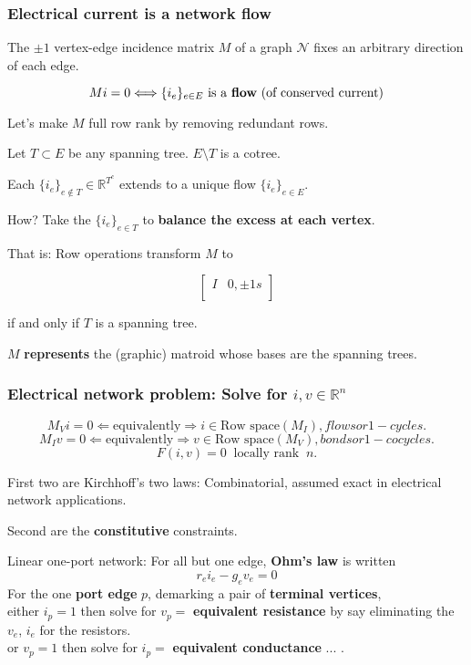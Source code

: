 \documentclass{beamer}
\newcommand{\Reals}{\ensuremath{\mathbb{R}}}
\begin{document}
\begin{frame}[fragile]
\frametitle{Electrical current is a network flow}

The $\pm 1$ vertex-edge incidence matrix $M$
of a graph $\mathcal{N}$ fixes 
an arbitrary direction of each edge.

\[
Mi=0 \Longleftrightarrow \{i_e\}_{e\in E} \text{ is a \textbf{flow} (of conserved
current)}
\]

Let's make $M$ full row rank by removing redundant rows.

Let $T\subset E$ be any spanning tree.  $E\setminus T$ is a cotree.

Each $\{i_e\}_{e\not\in T} \in \Reals^{T^c}$ extends to a unique flow 
$\{i_e\}_{e\in E}$. 

How?  Take the $\{i_e\}_{e\in T}$ to \textbf{balance
the excess at each vertex}.

That is: Row operations transform $M$ to 

\[
\left[
\begin{array}{c|c}
 I & 0,\pm 1 s \\
\end{array}
\right]
\]

\begin{center}
if and only if $T$ is a spanning tree.
\end{center}

$M$ \textbf{represents} the (graphic) 
matroid whose bases are the spanning trees.

\end{frame}


\begin{frame}
\frametitle{Electrical network problem: Solve for $i,v\in\Reals^n$}

\[
M_Vi = 0 \Leftarrow\text{equivalently}\Rightarrow i\in\text{Row space}{(M_I)},flows or 1-cycles.
\]
\[
M_Iv = 0 \Leftarrow\text{equivalently}\Rightarrow v\in\text{Row space}{(M_V)},bonds or 1-cocycles.
\]
\[
F(i,v) = 0 \;\;\text{locally rank}\;\;n.
\]

First two are Kirchhoff's two laws:  Combinatorial, assumed exact in electrical 
network applications.

Second are the \textbf{constitutive} constraints.

Linear one-port network:  For all but one edge, \textbf{Ohm's law} is written
\[r_ei_e - g_e v_e = 0\]
For the one \textbf{port edge} $p$, demarking a pair of 
\textbf{terminal vertices},\\
either
$i_p = 1$ then solve for $v_p=$ \textbf{equivalent resistance}
by say eliminating the $v_e$, $i_e$ for the resistors.\\
or $v_p = 1$ then solve for $i_p=$ \textbf{equivalent conductance} ... .

\end{frame}
\end{document}
